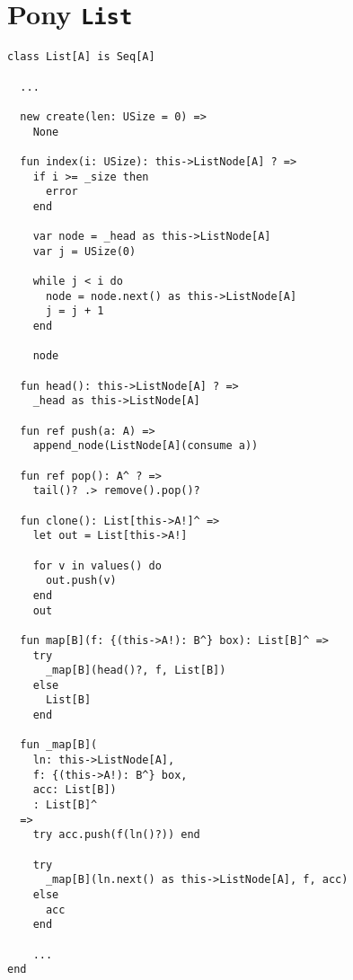 \chapter{Pony \texttt{List}} \label{appendix:list}

\begin{lstlisting}
class List[A] is Seq[A]
 
  ...

  new create(len: USize = 0) =>
    None

  fun index(i: USize): this->ListNode[A] ? =>
    if i >= _size then
      error
    end

    var node = _head as this->ListNode[A]
    var j = USize(0)

    while j < i do
      node = node.next() as this->ListNode[A]
      j = j + 1
    end

    node

  fun head(): this->ListNode[A] ? =>
    _head as this->ListNode[A]

  fun ref push(a: A) =>
    append_node(ListNode[A](consume a))

  fun ref pop(): A^ ? =>
    tail()? .> remove().pop()?

  fun clone(): List[this->A!]^ =>
    let out = List[this->A!]

    for v in values() do
      out.push(v)
    end
    out

  fun map[B](f: {(this->A!): B^} box): List[B]^ =>
    try
      _map[B](head()?, f, List[B])
    else
      List[B]
    end

  fun _map[B](
    ln: this->ListNode[A],
    f: {(this->A!): B^} box,
    acc: List[B])
    : List[B]^
  =>
    try acc.push(f(ln()?)) end

    try
      _map[B](ln.next() as this->ListNode[A], f, acc)
    else
      acc
    end
    
    ... 
end
\end{lstlisting}